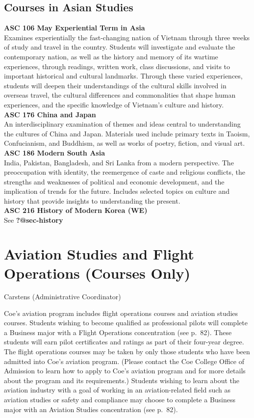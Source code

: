 \documentclass[
  letterpaper,
]{scrbook}
\begin{document}
\subsection{Courses in Asian Studies}\label{courses-in-asian-studies}

\textbf{ASC 106 May Experiential Term in Asia}\\
Examines experientially the fast-changing nation of Vietnam through
three weeks of study and travel in the country. Students will
investigate and evaluate the contemporary nation, as well as the history
and memory of its wartime experiences, through readings, written work,
class discussions, and visits to important historical and cultural
landmarks. Through these varied experiences, students will deepen their
understandings of the cultural skills involved in overseas travel, the
cultural differences and commonalities that shape human experiences, and
the specific knowledge of Vietnam's culture and history.\\
\textbf{ASC 176 China and Japan}\\
An interdisciplinary examination of themes and ideas central to
understanding the cultures of China and Japan. Materials used include
primary texts in Taoism, Confucianism, and Buddhism, as well as works of
poetry, fiction, and visual art.\\
\textbf{ASC 186 Modern South Asia}\\
India, Pakistan, Bangladesh, and Sri Lanka from a modern perspective.
The preoccupation with identity, the reemergence of caste and religious
conflicts, the strengths and weaknesses of political and economic
development, and the implication of trends for the future. Includes
selected topics on culture and history that provide insights to
understanding the present.\\
\textbf{ASC 216 History of Modern Korea (WE)}\\
See \textbf{?@sec-history}

\section{Aviation Studies and Flight Operations (Courses
Only)}\label{aviation-studies-and-flight-operations-courses-only}

Carstens (Administrative Coordinator)

Coe's aviation program includes flight operations courses and aviation
studies courses. Students wishing to become qualified as professional
pilots will complete a Business major with a Flight Operations
concentration (see p.~82). These students will earn pilot certificates
and ratings as part of their four-year degree. The flight operations
courses may be taken by only those students who have been admitted into
Coe's aviation program. (Please contact the Coe College Office of
Admission to learn how to apply to Coe's aviation program and for more
details about the program and its requirements.) Students wishing to
learn about the aviation industry with a goal of working in an
aviation-related field such as aviation studies or safety and compliance
may choose to complete a Business major with an Aviation Studies
concentration (see p.~82).
\end{document}

